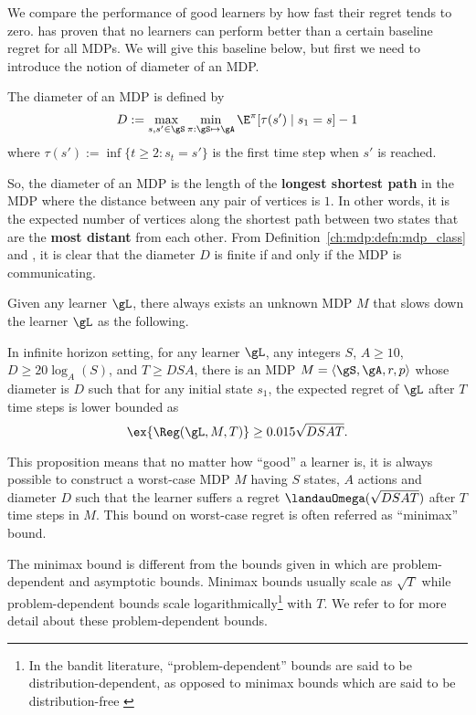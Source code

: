 We compare the performance of good learners by how fast their regret tends to zero.
\cite{jaksch2010near} has proven that no learners can perform better than a certain baseline regret for all MDPs.
We will give this baseline below, but first we need to introduce the notion of diameter of an MDP.
\begin{defn}
    The diameter of an MDP is defined by
    \begin{equation}
        \label{eq:diameter}
        D := \max_{s,s'\in\gS}\min_{\pi:\gS\mapsto\gA} \E^\pi[\tau(s') \mid s_1=s] -1
    \end{equation}
    where $\tau(s'):=\inf\{t\ge2 : s_t=s'\}$ is the first time step when $s'$ is reached.
    \label{ch:rl:defn:diameter}
\end{defn}
So, the diameter of an MDP is the length of the \textbf{longest shortest path} in the MDP where the distance between any pair of vertices is $1$.
In other words, it is the expected number of vertices along the shortest path between two states that are the \textbf{most distant} from each other.
From Definition~\ref{ch:mdp:defn:mdp_class} and \cite[Proposition~8.3.1]{puterman2014markov}, it is clear that the diameter $D$ is finite if and only if the MDP is communicating.

Given any learner $\gL$, there always exists an unknown MDP $M$ that slows down the learner $\gL$ as the following.
\begin{prop}
    \label{prop:minimax_rg_lb}
    In infinite horizon setting, for any learner $\gL$, any integers $S$, $A\ge10$, $D\ge 20\log_{A}(S)$, and $T\ge DSA$, there is an MDP $M=\langle\gS,\gA,r,p\rangle$ whose diameter is $D$ such that for any initial state $s_1$, the expected regret of $\gL$ after $T$ time steps is lower bounded as
    \begin{equation}
        \label{eq:minimax_rg_lb}
        \ex{\Reg(\gL, M, T)} \ge 0.015\sqrt{DSAT}.
    \end{equation}
\end{prop}
This proposition means that no matter how ``good'' a learner is, it is always possible to construct a worst-case MDP $M$ having $S$ states, $A$ actions and diameter $D$ such that the learner suffers a regret $\landauOmega(\sqrt{DSAT})$ after $T$ time steps in $M$.
This bound on worst-case regret is often referred as ``minimax'' bound.

The minimax bound is different from the bounds given in \cite{ok2018exploration, burnetas1997optimal} which are problem-dependent and asymptotic bounds.
Minimax bounds usually scale as $\sqrt{T}$ while problem-dependent bounds scale logarithmically\footnote{In the bandit literature, “problem-dependent” bounds are said to be distribution-dependent, as opposed to minimax bounds which are said to be distribution-free \cite{garivier2019explore}} with $T$.
We refer to \cite{ok2018exploration, burnetas1997optimal} for more detail about these problem-dependent bounds.

